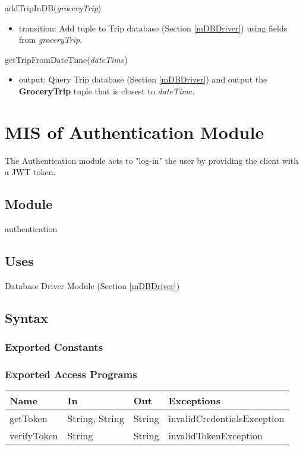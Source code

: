 \documentclass[12pt, titlepage]{article}
\begin{document}
\noindent addTripInDB(\textit{groceryTrip})
\begin{itemize}
\item transition: Add tuple to Trip database (Section \ref{mDBDriver}) using fields from \textit{groceryTrip}.
\end{itemize}

\noindent getTripFromDateTime(\textit{dateTime})
\begin{itemize}
\item output: Query Trip database (Section \ref{mDBDriver}) and output the \textbf{GroceryTrip} tuple that is closest to \textit{dateTime}.
\end{itemize}

\newpage

\section{MIS of Authentication Module} \label{mAuthentication} 
The Authentication module acts to "log-in" the user by providing the client with a JWT token.

\subsection{Module}

authentication

\subsection{Uses}

 Database Driver Module (Section \ref{mDBDriver}) 

\subsection{Syntax}

\subsubsection{Exported Constants}

\subsubsection{Exported Access Programs}

\begin{center}
\begin{tabular}{p{5cm} p{3cm} p{3cm} p{5cm}}
\hline
\textbf{Name} & \textbf{In} & \textbf{Out} & \textbf{Exceptions} \\
\hline
getToken & String, String & String & invalidCredentialsException \\
verifyToken & String & String & invalidTokenException \\
\hline
\end{tabular}
\end{center}
\end{document}
